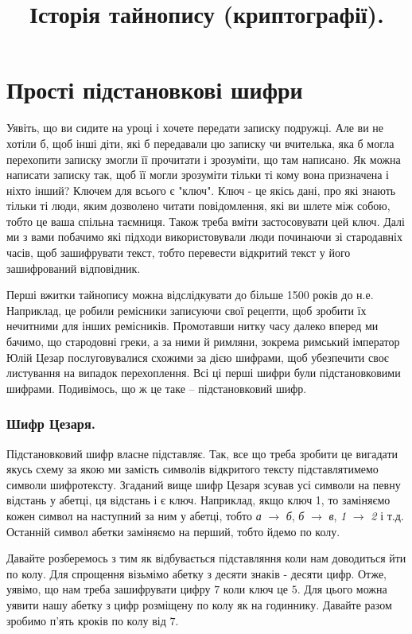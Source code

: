 \documentclass{book}
\title{Історія тайнопису (криптографії).}
\begin{document}
\maketitle

\chapter*{Прості підстановкові шифри}

Уявіть, що ви сидите на уроці і хочете передати записку подружці. Але ви не
хотіли б, щоб інші діти, які б передавали цю записку чи вчителька, яка б могла
перехопити записку змогли її прочитати і зрозуміти, що там написано. Як можна
написати записку так, щоб її могли зрозуміти тільки ті кому вона призначена і
ніхто інший? Ключем для всього є "ключ". Ключ - це якісь дані, про які знають
тільки ті люди, яким дозволено читати повідомлення, які ви шлете між собою,
тобто це ваша спільна таємниця. Також треба вміти застосовувати цей ключ. Далі
ми з вами побачимо які підходи використовували люди починаючи зі стародавніх
часів, щоб зашифрувати текст, тобто перевести відкритий текст у його
зашифрований відповідник.

Перші вжитки тайнопису можна відслідкувати до більше 1500 років до н.е.
Наприклад, це робили ремісники записуючи свої рецепти, щоб зробити їх нечитними
для інших ремісників. Промотавши нитку часу далеко вперед ми бачимо, що
стародовні греки, а за ними й римляни, зокрема римський імператор Юлій Цезар послуговувалися
схожими за дією шифрами, щоб убезпечити своє листування на випадок
перехоплення. Всі ці перші шифри були підстановковими шифрами. Подивімось, що ж це
таке -- підстановковий шифр.

\subsection*{Шифр Цезаря.}

Підстановковий шифр власне підставляє. Так, все що треба зробити це вигадати
якусь схему за якою ми замість символів відкритого тексту підставлятимемо
символи шифротексту. Згаданий вище шифр Цезаря зсував усі символи на певну
відстань у абетці, ця відстань і є ключ. Наприклад, якщо ключ 1, то заміняємо
кожен символ на наступний за ним у абетці, тобто \emph{а} $\to$ \emph{б},
\emph{б} $\to$ \emph{в}, \emph{1} $\to$ \emph{2} і т.д. Останній символ абетки
заміняємо на перший, тобто йдемо по колу.

Давайте розберемось з тим як відбувається підставляння коли нам доводиться йти
по колу. Для спрощення візьмімо абетку з десяти знаків - десяти цифр. Отже,
уявімо, що нам треба зашифрувати цифру $7$ коли ключ це $5$. Для цього можна уявити
нашу абетку з цифр розміщену по колу як на годиннику. Давайте разом зробимо
п'ять кроків по колу від $7$.
\end{document}
